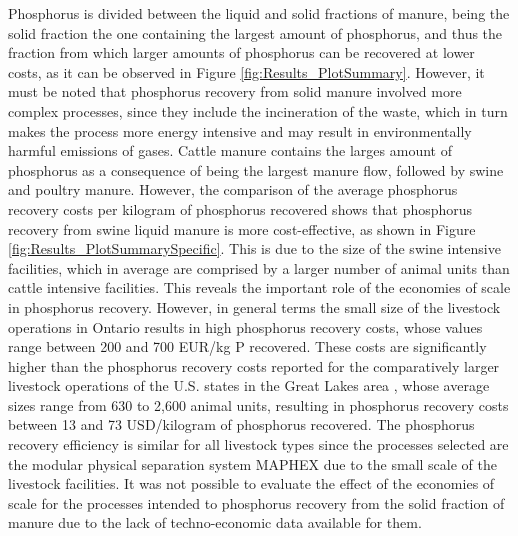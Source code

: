 \documentclass[]{elsarticle}
\begin{document}
Phosphorus is divided between the liquid and solid fractions of manure, being the solid fraction the one containing the largest amount of phosphorus, and thus the fraction from which larger amounts of phosphorus can be recovered at lower costs, as it can be observed in Figure \ref{fig:Results_PlotSummary}. However, it must be noted that phosphorus recovery from solid manure involved more complex processes, since they include the incineration of the waste, which in turn makes the process more energy intensive and may result in environmentally harmful emissions of gases. Cattle manure contains the larges amount of phosphorus as a consequence of being the largest manure flow, followed by swine and poultry manure. However, the comparison of the average phosphorus recovery costs per kilogram of phosphorus recovered shows that phosphorus recovery from swine liquid manure is more cost-effective, as shown in Figure \ref{fig:Results_PlotSummarySpecific}. This is due to the size of the swine intensive facilities, which in average are comprised by a larger number of animal units than cattle intensive facilities. This reveals the important role of the economies of scale in phosphorus recovery. However, in general terms the small size of the livestock operations in Ontario results in high phosphorus recovery costs, whose values range between 200 and 700 EUR/kg P recovered. These costs are significantly higher than the phosphorus recovery costs reported for the comparatively larger livestock operations of the U.S. states in the Great Lakes area \citep{martin2022analysis}, whose average sizes range from 630 to 2,600 animal units, resulting in phosphorus recovery costs between 13 and 73 USD/kilogram of phosphorus recovered. The phosphorus recovery efficiency is similar for all livestock types since the processes selected are the modular physical separation system MAPHEX \citep{church_versatility_2018} due to the small scale of the livestock facilities.
It was not possible to evaluate the effect of the economies of scale for the processes intended to phosphorus recovery from the solid fraction of manure due to the lack of techno-economic data available for them.
\end{document}
